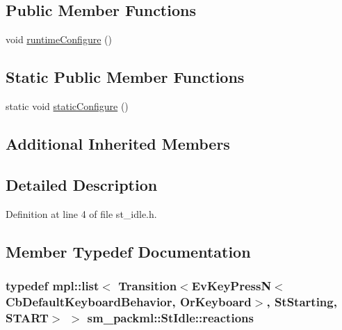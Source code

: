 \subsection*{Public Member Functions}
\begin{DoxyCompactItemize}
\item 
void \hyperlink{structsm__packml_1_1StIdle_ae4ae54c43e2ee7372a753eda8cd9abac}{runtime\+Configure} ()
\end{DoxyCompactItemize}
\subsection*{Static Public Member Functions}
\begin{DoxyCompactItemize}
\item 
static void \hyperlink{structsm__packml_1_1StIdle_a4fe82f96b9329edc9a5a450e1590c11e}{static\+Configure} ()
\end{DoxyCompactItemize}
\subsection*{Additional Inherited Members}


\subsection{Detailed Description}


Definition at line 4 of file st\+\_\+idle.\+h.



\subsection{Member Typedef Documentation}
\subsubsection[{\texorpdfstring{reactions}{reactions}}]{\setlength{\rightskip}{0pt plus 5cm}typedef mpl\+::list$<$ Transition$<$Ev\+Key\+PressN$<$Cb\+Default\+Keyboard\+Behavior, {\bf Or\+Keyboard}$>$, {\bf St\+Starting}, {\bf S\+T\+A\+RT}$>$ $>$ {\bf sm\+\_\+packml\+::\+St\+Idle\+::reactions}}\hypertarget{structsm__packml_1_1StIdle_abcbcf0e43c5a244b09d3a449e51e9524}{}\label{structsm__packml_1_1StIdle_abcbcf0e43c5a244b09d3a449e51e9524}


